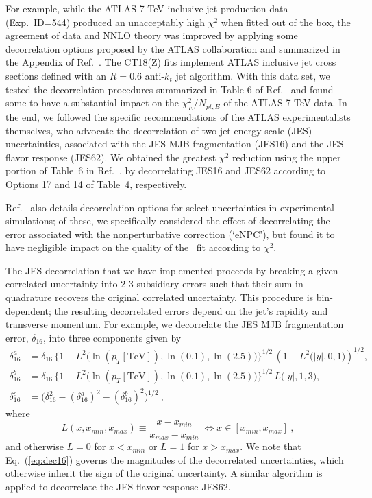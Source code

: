 %
%
For example, while the ATLAS 7 TeV inclusive jet production data \cite{Aad:2014vwa} (Exp.~ID=544) produced an unacceptably high $\chi^2$ when fitted out of the box, the agreement of data and NNLO theory was improved by applying some decorrelation options
proposed by the ATLAS collaboration and summarized in the Appendix of Ref.~\cite{Aaboud:2017dvo}. 
The CT18(Z) fits implement ATLAS inclusive jet cross sections defined with an $R=0.6$ anti-$k_t$ jet algorithm. With this data set, we tested
the decorrelation procedures summarized in Table 6 of Ref.~\cite{Aaboud:2017dvo} and 
found some to have a substantial impact on the $\chi^2_E/N_\mathit{pt,E}$ of the ATLAS 7 TeV data. In the end, we followed the specific recommendations
of the ATLAS experimentalists themselves, who advocate \cite{Bogdan} the decorrelation of two jet energy scale (JES) uncertainties, associated with the JES MJB fragmentation (JES16) and the JES flavor response
(JES62). We obtained the greatest $\chi^2$ reduction using the upper portion of Table~6 in Ref.~\cite{Aaboud:2017dvo},
by decorrelating JES16 and JES62 according to Options 17 and 14 of Table~4, respectively. 

Ref.~\cite{Aaboud:2017dvo}
also details decorrelation options for select uncertainties in experimental simulations; 
of these, we specifically considered the effect of
decorrelating the error associated with the nonperturbative correction (`eNPC'), but found it to have negligible impact
on the quality of the \CTHERAII~fit according to $\chi^2$. 

The JES decorrelation that we have implemented proceeds by breaking a given correlated uncertainty into 2-3 subsidiary errors such that their sum in quadrature recovers the original correlated uncertainty. This procedure is bin-dependent; the resulting decorrelated
errors depend on the jet's rapidity and transverse momentum. For example, we decorrelate the JES MJB fragmentation error, $\delta_{16}$, into
three components given by
%
\begin{align}
	\delta^a_{16} &= \delta_{16}\, \Big\{ 1 - L^2\big( \ln(p_T[\mathrm{TeV}]),\ln(0.1),\ln(2.5) \big) \Big\}^{1/2}\, \left( 1 - L^2\big(|y|,0,1\big) \right)^{1/2}, \nonumber \\
	\delta^b_{16} &= \delta_{16}\, \Big\{ 1 - L^2\big( \ln(p_T[\mathrm{TeV}]),\ln(0.1),\ln(2.5) \big) \Big\}^{1/2}\, L\big(|y|,1,3\big), \nonumber \\
	\delta^c_{16} &= \big( \delta^2_{16} - (\delta^a_{16})^2 - (\delta^b_{16})^2 \big)^{1/2}\ ,
\label{eq:dec16}
\end{align}
%
where
%
\begin{equation}
L(x,x_\mathit{min},x_\mathit{max}) \equiv \frac{x - x_\mathit{min}}{x_\mathit{max} - x_\mathit{min}}\ \iff x \in [x_\mathit{min},x_\mathit{max}]\ ,
\end{equation}
%
and otherwise $L = 0$ for $x < x_\mathit{min}$ or $L = 1$ for $x > x_\mathit{max}$. We note that Eq.~(\ref{eq:dec16}) governs the magnitudes of the decorrelated uncertainties, which otherwise
inherit the sign of the original uncertainty. A similar algorithm is applied to decorrelate the JES flavor response JES62.

